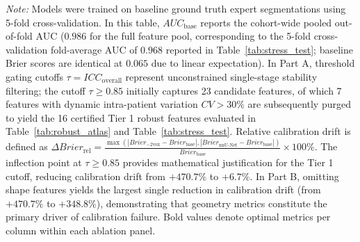 \begin{table}[htbp]
\begin{tabular}{lcccccc}
\bottomrule
\end{tabular}
\begin{flushleft}
\footnotesize \textit{Note:} Models were trained on baseline ground truth expert segmentations using 5-fold cross-validation. In this table, $AUC_{\text{base}}$ reports the cohort-wide pooled out-of-fold AUC ($0.986$ for the full feature pool, corresponding to the 5-fold cross-validation fold-average AUC of $0.968$ reported in Table~\ref{tab:stress_test}; baseline Brier scores are identical at $0.065$ due to linear expectation). In Part A, threshold gating cutoffs $\tau = ICC_{\text{overall}}$ represent unconstrained single-stage stability filtering; the cutoff $\tau \ge 0.85$ initially captures 23 candidate features, of which 7 features with dynamic intra-patient variation $CV > 30\%$ are subsequently purged to yield the 16 certified Tier 1 robust features evaluated in Table~\ref{tab:robust_atlas} and Table~\ref{tab:stress_test}. Relative calibration drift is defined as $\Delta Brier_{\text{rel}} = \frac{\max(|Brier_{-2\text{vox}} - Brier_{\text{base}}|, |Brier_{\text{nnU-Net}} - Brier_{\text{base}}|)}{Brier_{\text{base}}} \times 100\%$. The inflection point at $\tau \ge 0.85$ provides mathematical justification for the Tier 1 cutoff, reducing calibration drift from $+470.7\%$ to $+6.7\%$. In Part B, omitting shape features yields the largest single reduction in calibration drift (from $+470.7\%$ to $+348.8\%$), demonstrating that geometry metrics constitute the primary driver of calibration failure. Bold values denote optimal metrics per column within each ablation panel.
\end{flushleft}
\end{table}
